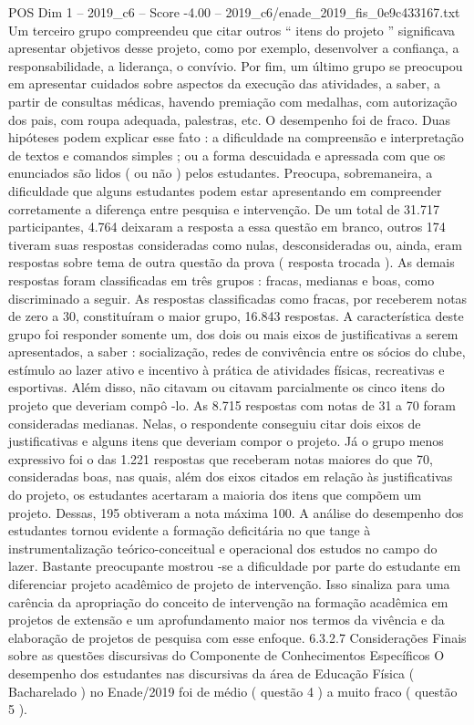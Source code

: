 \begin{textsample}{POS Dim 1 – 2019\_c6 – Score -4.00 – 2019\_c6/enade\_2019\_fis\_0e9c433167.txt}
Um terceiro grupo compreendeu que citar outros “ itens do projeto ” significava apresentar objetivos desse projeto, como por exemplo, desenvolver a confiança, a responsabilidade, a liderança, o convívio.
Por fim, um último grupo se preocupou em apresentar cuidados sobre aspectos da execução das atividades, a saber, a partir de consultas médicas, havendo premiação com medalhas, com autorização dos pais, com roupa adequada, palestras, etc.
O desempenho foi de fraco.
Duas hipóteses podem explicar esse fato : a dificuldade na compreensão e interpretação de textos e comandos simples ; ou a forma descuidada e apressada com que os enunciados são lidos ( ou não ) pelos estudantes.
Preocupa, sobremaneira, a dificuldade que alguns estudantes podem estar apresentando em compreender corretamente a diferença entre pesquisa e intervenção.
De um total de 31.717 participantes, 4.764 deixaram a resposta a essa questão em branco, outros 174 tiveram suas respostas consideradas como nulas, desconsideradas ou, ainda, eram respostas sobre tema de outra questão da prova ( resposta trocada ).
As demais respostas foram classificadas em três grupos : fracas, medianas e boas, como discriminado a seguir.
As respostas classificadas como fracas, por receberem notas de zero a 30, constituíram o maior grupo, 16.843 respostas.
A característica deste grupo foi responder somente um, dos dois ou mais eixos de justificativas a serem apresentados, a saber : socialização, redes de convivência entre os sócios do clube, estímulo ao lazer ativo e incentivo à prática de atividades físicas, recreativas e esportivas.
Além disso, não citavam ou citavam parcialmente os cinco itens do projeto que deveriam compô -lo.
As 8.715 respostas com notas de 31 a 70 foram consideradas medianas.
Nelas, o respondente conseguiu citar dois eixos de justificativas e alguns itens que deveriam compor o projeto.
Já o grupo menos expressivo foi o das 1.221 respostas que receberam notas maiores do que 70, consideradas boas, nas quais, além dos eixos citados em relação às justificativas do projeto, os estudantes acertaram a maioria dos itens que compõem um projeto.
Dessas, 195 obtiveram a nota máxima 100.
A análise do desempenho dos estudantes tornou evidente a formação deficitária no que tange à instrumentalização teórico-conceitual e operacional dos estudos no campo do lazer.
Bastante preocupante mostrou -se a dificuldade por parte do estudante em diferenciar projeto acadêmico de projeto de intervenção.
Isso sinaliza para uma carência da apropriação do conceito de intervenção na formação acadêmica em projetos de extensão e um aprofundamento maior nos termos da vivência e da elaboração de projetos de pesquisa com esse enfoque. 6.3.2.7 Considerações Finais sobre as questões discursivas do Componente de Conhecimentos Específicos O desempenho dos estudantes nas discursivas da área de Educação Física ( Bacharelado ) no Enade/2019 foi de médio ( questão 4 ) a muito fraco ( questão 5 ).

\end{textsample}
